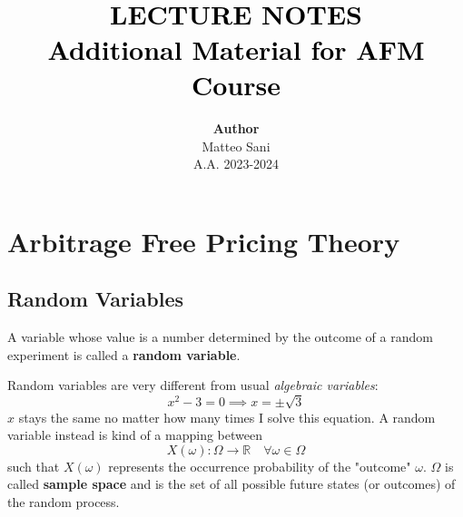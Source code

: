 \documentclass[12pt,a4paper]{book}
\newcommand{\HRule}[1]{\color{blue}{\rule{\linewidth}{#1}}}
\begin{document}
\title{\normalsize \textsc{}
		\\ [2.0cm]
		\HRule{2.0pt} \\
		\HRule{2.0pt} \\ [0.6cm]
		\LARGE \textbf{\textcolor{black}{\uppercase{lecture notes}}
		\HRule{2.0pt} \\ [0.6cm] \textcolor{black}{\Large{Additional Material for AFM Course}} \vspace*{10\baselineskip}}
		}
\date{}
\author{\textbf{Author} \\ 
		Matteo Sani \\
		A.A. 2023-2024}

\maketitle

\chapter{Arbitrage Free Pricing Theory}
\section{Random Variables}
A variable whose value is a number determined by the outcome of a random experiment is called a \textbf{random variable}.

Random variables are very different from usual \emph{algebraic variables}:
\begin{equation*}
x^2 - 3 = 0 \implies x = \pm \sqrt{3}
\end{equation*}	
$x$ stays the same no matter how many times I solve this equation.
A random variable instead is kind of a mapping between 
\begin{equation*}
X(\omega):\Omega\rightarrow \mathbb{R}\quad \forall\omega\in\Omega
\end{equation*}
such that $X(\omega)$ represents the occurrence probability of the "outcome" $\omega$. $\Omega$ is called \textbf{sample space} and is the set of all possible future states (or outcomes) of the random process.
	
\end{document}
